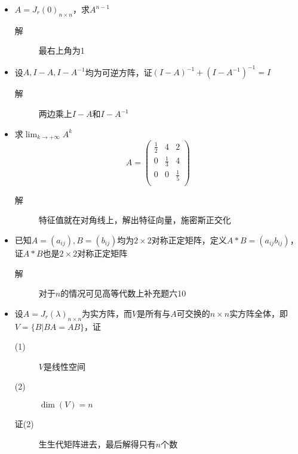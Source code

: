 \begin{itemize}
\item $A=J_r(0)_{n \times n}$，求$A^{n-1}$
\begin{description}
\item[解] 最右上角为1
\end{description}

\item 设$A,I-A,I-A^{-1}$均为可逆方阵，证$(I-A)^{-1}+(I-A^{-1})^{-1}=I$
\begin{description}
\item[解] 两边乘上$I-A$和$I-A^{-1}$
\end{description}

\item 求$\lim_{k \to +\infty}A^k$
\[
A=\left(
\begin{array}{ccc}
\frac{1}{2} & 4 & 2 \\
0 & \frac{1}{3} & 4 \\
0 & 0 & \frac{1}{5} \\
\end{array}
\right)
\]
\begin{description}
\item[解] 特征值就在对角线上，解出特征向量，施密斯正交化
\end{description}

\item 已知$A=(a_{ij}),B=(b_{ij})$均为$2\times 2$对称正定矩阵，定义$A*B=(a_{ij}b_{ij})$，证$A*B$也是$2\times 2$对称正定矩阵
\begin{description}
\item[解] 对于$n$的情况可见高等代数上补充题六10
\end{description}

\item 设$A=J_r(\lambda)_{n \times n}$为实方阵，而$V$是所有与$A$可交换的$n \times n$实方阵全体，即$V=\{B|BA=AB\}$，证
\begin{description}
\item[(1)] $V$是线性空间
\item[(2)] $\dim(V)=n$
\item[证(2)] 生生代矩阵进去，最后解得只有$n$个数
\end{description}


\end{itemize}

